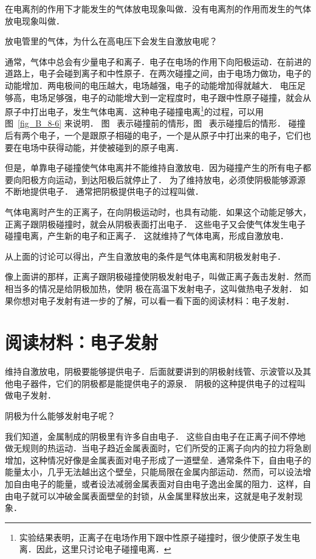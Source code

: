在电离剂的作用下才能发生的气体放电现象叫做．没有电离剂的作用而发生的气体放电现象叫做．

放电管里的气体，为什么在高电压下会发生自激放电呢？

通常，气体中总会有少量电子和离子．电子在电场的作用下向阳极运动．在前进的道路上，电子会碰到离子和中性原子．在两次碰撞之间，由于电场力做功，电子的动能增加．两电极间的电压越大，电场越强，电子的动能增加得就越大．
电压足够高，电场足够强，电子的动能增大到一定程度时，电子跟中性原子碰撞，就会从原子中打出电子，发生气体电离．这种电子碰撞电离\footnote{实验结果表明，正离子在电场作用下跟中性原子碰撞时，很少使原子发生电离．因此，这里只讨论电子碰撞电离．}的过程，可以用图~\ref{fig_B_8-6} 来说明．
图~ 表示碰撞前的情形，图~ 表示碰撞后的情形．
碰撞后有两个电子，一个是跟原子相碰的电子，一个是从原子中打出来的电子，它们也要在电场中获得动能，并使被碰到的原子电离．

但是，单靠电子碰撞使气体电离并不能维持自激放电．因为碰撞产生的所有电子都要向阳极方向运动，到达阳极后就停止了．
为了维持放电，必须使阴极能够源源不断地提供电子．
通常把阴极提供电子的过程叫做．

气体电离时产生的正离子，在向阴极运动时，也具有动能．如果这个动能足够大，正离子跟阴极碰撞时，就会从阴极表面打出电子．
这些电子又会使气体发生电子碰撞电离，产生新的电子和正离子．
这就维持了气体电离，形成自激放电．

从上面的讨论可以得出，产生自激放电的条件是气体电离和阴极发射电子．

像上面讲的那样，正离子跟阴极碰撞使阴极发射电子，叫做正离子轰击发射．然而相当多的情况是给阴极加热，使阴
极在高温下发射电子，这叫做热电子发射．
如果你想对电子发射有进一步的了解，可以看一看下面的阅读材料：电子发射．


\section*{阅读材料：电子发射}
维持自激放电，阴极要能够提供电子．后面就要讲到的阴极射线管、示波管以及其他电子器件，它们的阴极都是能提供电子的源泉．
阴极的这种提供电子的过程叫做电子发射．

阴极为什么能够发射电子呢？

我们知道，金属制成的阴极里有许多自由电子．
这些自由电子在正离子间不停地做无规则的热运动．当电子趋近金属表面时，它们所受的正离子向内的拉力将急剧增加，这种情况好像是金属表面对电子形成了一道壁垒．通常条件下，自由电子的能量太小，几乎无法越出这个壁垒，只能局限在金属内部运动．然而，可以设法增加自由电子的能量，或者设法减弱金属表面对自由电子逸出金属的阻力．这样，自由电子就可以冲破金属表面壁垒的封锁，从金属里释放出来，这就是电子发射现象．

